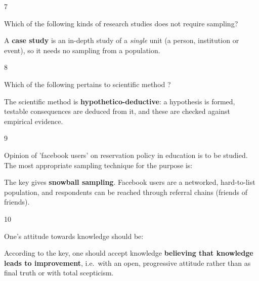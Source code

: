 \begin{question}{7}
{Which of the following kinds of research studies does not require sampling?\par}
\begin{explain}
A \textbf{case study} is an in-depth study of a \emph{single} unit (a person, institution or event), so it needs no sampling from a population.
\end{explain}
\end{question}

\begin{question}{8}
{Which of the following pertains to scientific method ?\par}
\begin{explain}
The scientific method is \textbf{hypothetico-deductive}: a hypothesis is formed, testable consequences are deduced from it, and these are checked against empirical evidence.
\end{explain}
\end{question}

\begin{question}{9}
{Opinion of 'facebook users' on reservation policy in education is to be studied. The most appropriate sampling technique for the purpose is:\par}
\begin{explain}
The key gives \textbf{snowball sampling}. Facebook users are a networked, hard-to-list population, and respondents can be reached through referral chains (friends of friends).
\end{explain}
\end{question}

\begin{question}{10}
{One's attitude towards knowledge should be:\par}
\begin{explain}
According to the key, one should accept knowledge \textbf{believing that knowledge leads to improvement}, i.e.\ with an open, progressive attitude rather than as final truth or with total scepticism.
\end{explain}
\end{question}

